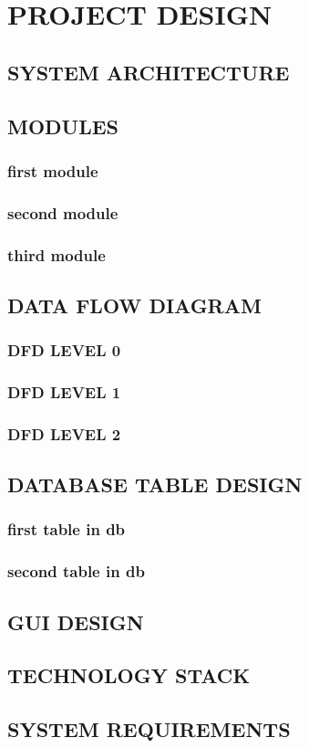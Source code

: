 \chapter{PROJECT DESIGN}
\vspace{-1 cm}
\section{SYSTEM ARCHITECTURE}
\section{MODULES}
\subsection{first module}

\subsection{second module}
\subsection{third module}



\section{DATA FLOW DIAGRAM}
\subsection{DFD LEVEL 0}
\renewcommand\thefigure{\thechapter.\arabic{figure}}


\subsection{DFD LEVEL 1}

\subsection{DFD LEVEL 2}
\renewcommand\thefigure{\thechapter.\arabic{figure}}


\newpage
\section{DATABASE TABLE DESIGN}
\subsection{first table in db}

\subsection{second table in db}


\section{GUI DESIGN}

\section{TECHNOLOGY STACK}

\section{SYSTEM REQUIREMENTS}